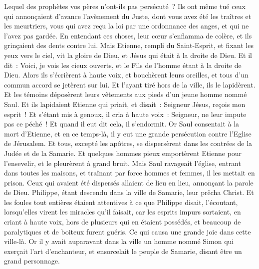 \begin{multicols}{2}
Lequel des prophètes vos pères n'ont-ils pas persécuté~? Ils ont même tué ceux qui annonçaient d'avance l'avènement du Juste, dont vous avez été les traîtres et les meurtriers,
vous qui avez reçu la loi par une ordonnance des anges, et qui ne l'avez pas gardée.
En entendant ces choses, leur cœur s'enflamma de colère, et ils grinçaient des dents contre lui.
Mais Etienne, rempli du Saint-Esprit, et fixant les yeux vers le ciel, vit la gloire de Dieu, et Jésus qui était à la droite de Dieu.
Et il dit~: Voici, je vois les cieux ouverts, et le Fils de l'homme étant à la droite de Dieu.
Alors ils s'écrièrent à haute voix, et bouchèrent leurs oreilles, et tous d'un commun accord se jetèrent sur lui.
Et l'ayant tiré hors de la ville, ils le lapidèrent. Et les témoins déposèrent leurs vêtements aux pieds d'un jeune homme nommé Saul.
Et ils lapidaient Etienne qui priait, et disait~: Seigneur Jésus, reçois mon esprit~!
Et s'étant mis à genoux, il cria à haute voix~: Seigneur, ne leur impute pas ce péché~! Et quand il eut dit cela, il s'endormit.
\VerseOne{}Or Saul consentait à la mort d'Etienne, et en ce temps-là, il y eut une grande persécution contre l'Eglise de Jérusalem. Et tous, excepté les apôtres, se dispersèrent dans les contrées de la Judée et de la Samarie.
Et quelques hommes pieux emportèrent Etienne pour l'ensevelir, et le pleurèrent à grand bruit.
Mais Saul ravageait l'église, entrant dans toutes les maisons, et traînant par force hommes et femmes, il les mettait en prison.
Ceux qui avaient été dispersés allaient de lieu en lieu, annonçant la parole de Dieu.
Philippe, étant descendu dans la ville de Samarie, leur prêcha Christ.
Et les foules tout entières étaient attentives à ce que Philippe disait, l'écoutant, lorsqu'elles virent les miracles qu'il faisait,
car les esprits impurs sortaient, en criant à haute voix, hors de plusieurs qui en étaient possédés, et beaucoup de paralytiques et de boiteux furent guéris.
Ce qui causa une grande joie dans cette ville-là.
Or il y avait auparavant dans la ville un homme nommé Simon qui exerçait l'art d'enchanteur, et ensorcelait le peuple de Samarie, disant être un grand personnage.

\end{multicols}
